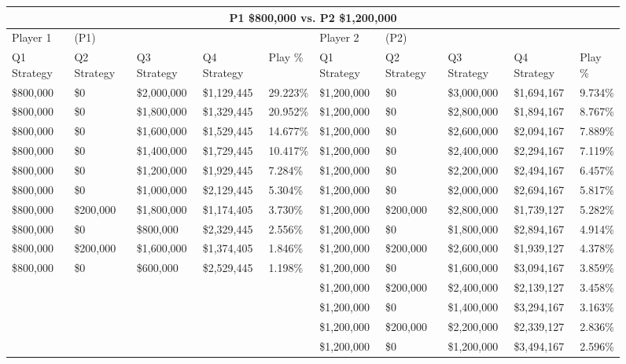 \documentclass[11pt]{article}
\begin{document}
\begin{figure}
\tiny
\begin{tabular}{ |p{1.0cm}p{1.0cm}p{1.0cm}p{2.0cm}|p{1.0cm}||p{1.0cm}p{1.0cm}p{1.0cm}p{2.0cm}|p{1.0cm}|}
\hline
\multicolumn{10}{|c|}{P1 \$800,000 vs. P2 \$1,200,000} \\
\hline
Player 1 & (P1) & & & & Player 2 & (P2) & & & \\
\hline
Q1 Strategy & Q2 Strategy & Q3 Strategy & Q4 Strategy  &  Play \% & Q1 Strategy & Q2 Strategy & Q3 Strategy & Q4 Strategy  &  Play \%\\
\hline
\$800,000 & \$0 & \$2,000,000 & \$1,129,445 & 29.223\% & \$1,200,000 & \$0 & \$3,000,000 & \$1,694,167 & 9.734\% \\
\$800,000 & \$0 & \$1,800,000 & \$1,329,445 & 20.952\% & \$1,200,000 & \$0 & \$2,800,000 & \$1,894,167 & 8.767\% \\
\$800,000 & \$0 & \$1,600,000 & \$1,529,445 & 14.677\% & \$1,200,000 & \$0 & \$2,600,000 & \$2,094,167 & 7.889\% \\
\$800,000 & \$0 & \$1,400,000 & \$1,729,445 & 10.417\% & \$1,200,000 & \$0 & \$2,400,000 & \$2,294,167 & 7.119\% \\
\$800,000 & \$0 & \$1,200,000 & \$1,929,445 & 7.284\% & \$1,200,000 & \$0 & \$2,200,000 & \$2,494,167 & 6.457\% \\
\$800,000 & \$0 & \$1,000,000 & \$2,129,445 & 5.304\% & \$1,200,000 & \$0 & \$2,000,000 & \$2,694,167 & 5.817\% \\
\$800,000 & \$200,000 & \$1,800,000 & \$1,174,405 & 3.730\% & \$1,200,000 & \$200,000 & \$2,800,000 & \$1,739,127 & 5.282\% \\
\$800,000 & \$0 & \$800,000 & \$2,329,445 & 2.556\% & \$1,200,000 & \$0 & \$1,800,000 & \$2,894,167 & 4.914\% \\
\$800,000 & \$200,000 & \$1,600,000 & \$1,374,405 & 1.846\% & \$1,200,000 & \$200,000 & \$2,600,000 & \$1,939,127 & 4.378\% \\
\$800,000 & \$0 & \$600,000 & \$2,529,445 & 1.198\% & \$1,200,000 & \$0 & \$1,600,000 & \$3,094,167 & 3.859\% \\
&  &  &  &  & \$1,200,000 & \$200,000 & \$2,400,000 & \$2,139,127 & 3.458\% \\
&  &  &  &  & \$1,200,000 & \$0 & \$1,400,000 & \$3,294,167 & 3.163\% \\
&  &  &  &  & \$1,200,000 & \$200,000 & \$2,200,000 & \$2,339,127 & 2.836\% \\
&  &  &  &  & \$1,200,000 & \$0 & \$1,200,000 & \$3,494,167 & 2.596\% \\

\end{tabular}
\end{figure}
\end{document}
